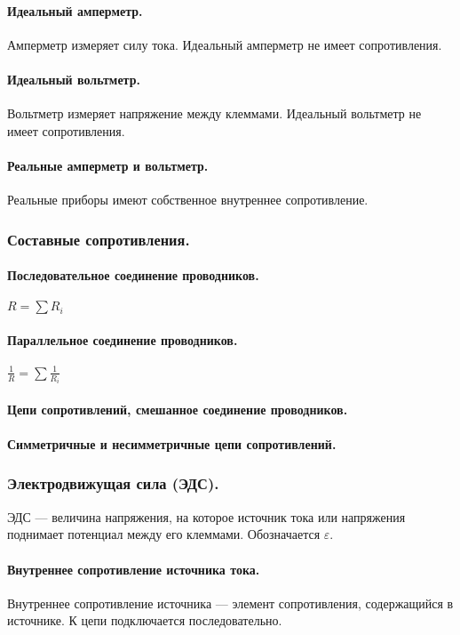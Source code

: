 \documentclass{article}
\begin{document}
            \paragraph{Идеальный амперметр.}
                Амперметр измеряет силу тока. Идеальный амперметр не имеет сопротивления.
            \paragraph{Идеальный вольтметр.}
                Вольтметр измеряет напряжение между клеммами. Идеальный вольтметр не имеет сопротивления.
            \paragraph{Реальные амперметр и вольтметр.}
                Реальные приборы имеют собственное внутреннее сопротивление.
        \subsubsection{Составные сопротивления.}
            \paragraph{Последовательное соединение проводников.}
                \(R = \sum{R_i}\)
            \paragraph{Параллельное соединение проводников.}
                \(\frac{1}{R} = \sum{\frac{1}{R_i}}\)
            \paragraph{Цепи сопротивлений, смешанное соединение проводников.}
            \paragraph{Симметричные и несимметричные цепи сопротивлений.}
        \subsubsection{Электродвижущая сила (ЭДС).}
                ЭДС --- величина напряжения, на которое источник тока или напряжения поднимает потенциал между его клеммами. Обозначается \(\varepsilon\).
            \paragraph{Внутреннее сопротивление источника тока.}
                Внутреннее сопротивление источника --- элемент сопротивления, содержащийся в источнике. К цепи подключается последовательно.
\end{document}
